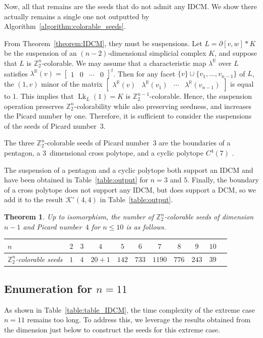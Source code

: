 \documentclass[11pt]{amsart}
\theoremstyle{plain}
\newtheorem{theorem}{Theorem}[section]
\numberwithin{equation}{section}
\theoremstyle{definition}
\newcommand{\cK}{\mathcal{K}}
\newcommand{\R}{\mathbb{R}}
\newcommand{\Z}{\mathbb{Z}}
\DeclareMathOperator{\Lk}{Lk}
\begin{document}
Now, all that remains are the seeds that do not admit any IDCM.
We show there actually remains a single one not outputted by Algorithm~\ref{algorithm:colorable_seeds}.

From Theorem~\ref{theorem:IDCM}, they must be suspensions.
Let $L=\partial{[v, w]} \ast K$ be the suspension of an $(n-2)$-dimensional simplicial complex $K$, and suppose that $L$ is $\Z_2^{n}$-colorable.
We may assume that a characteristic map $\lambda^\R$ over $L$ satisfies $\lambda^\R(v)=\begin{bmatrix} 1 & 0 & \cdots & 0  \end{bmatrix}^t$.
Then for any facet $\{v\} \cup \{v_1, \ldots, v_{n-1} \}$ of $L$, the $(1, v)$ minor of the matrix $\begin{bmatrix} \lambda^\R(v) & \lambda^\R(v_1) & \cdots & \lambda^\R(v_{n-1}) \end{bmatrix}$ is equal to $1$.
This implies that $\Lk_L(1)=K$ is $\Z_2^{n-1}$-colorable.
Hence, the suspension operation preserves $\Z_2^{n}$-colorability while also preserving seedness, and increases the Picard number by one.
Therefore, it is sufficient to consider the suspensions of the seeds of Picard number~$3$.

The three $\Z_2^n$-colorable seeds of Picard number~$3$ are the boundaries of a pentagon, a $3$~dimensional cross polytope, and a cyclic polytope $C^4(7)$ \cite{Erokhovets2011}.

The suspension of a pentagon and a cyclic polytope both support an IDCM and 
have been obtained in Table~\ref{table:output} for $n=3$ and $5$.
Finally, the boundary of a cross polytope does not support any IDCM, but does support a DCM, so we add it to the result $\cK^\circ(4,4)$ in Table~\ref{table:output}.

\begin{theorem}
	Up to isomorphism, the number of $\Z_2^n$-colorable seeds of dimension $n-1$ and Picard number~$4$ for $n\leq 10$ is as follows.
	\begin{center}
		\begin{tabular}{l*{10}{c}}
			\toprule
			$ n$ & $2$ & $3$ & $4$  &  $5$  &  $6$  &  $7$   &  $8$  &  $9$  & $10$  \tabularnewline \midrule
			$\Z_2^n$-colorable seeds                 & $1$ & $4$ & $20+1$ & $142$ & $733$ & $1190$ & $776$ & $243$ & $39$  \tabularnewline \bottomrule
		\end{tabular}
	\end{center}
\end{theorem}


\subsection{Enumeration for $n=11$} \label{subsection:n=11}
As shown in Table~\ref{table:table_IDCM}, the time complexity of the extreme case $n=11$ remains too long.
To address this, we leverage the results obtained from the dimension just below to construct the seeds for this extreme case.
\end{document}
